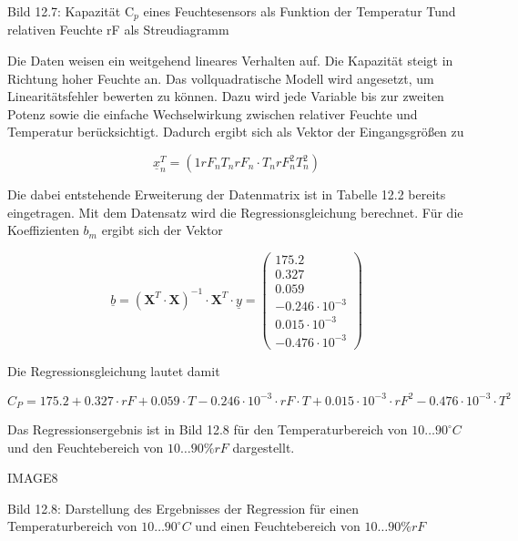 \noindent Bild 12.7: Kapazit\"{a}t C${}_{p}$ eines Feuchtesensors als Funktion der Temperatur Tund relativen Feuchte rF als Streudiagramm

\noindent Die Daten weisen ein weitgehend lineares Verhalten auf. Die Kapazit\"{a}t steigt in Richtung hoher Feuchte an. Das vollquadratische Modell wird angesetzt, um Linearit\"{a}tsfehler bewerten zu k\"{o}nnen. Dazu wird jede Variable bis zur zweiten Potenz sowie die einfache Wechselwirkung zwischen relativer Feuchte und Temperatur ber\"{u}cksichtigt. Dadurch ergibt sich als Vektor der Eingangsgr\"{o}{\ss}en zu

\begin{equation}\label{eq:thirteenthirty}
\underline{x}_{n}^{T} =\left(1 rF_{n} T_{n} rF_{n} \cdot T_{n} rF_{n}^{2} T_{n}^{2} \right)
\end{equation}

\noindent Die dabei entstehende Erweiterung der Datenmatrix ist in Tabelle 12.2 bereits eingetragen. Mit dem Datensatz wird die Regressionsgleichung berechnet. F\"{u}r die Koeffizienten $b_{m}$ ergibt sich der Vektor

\begin{equation}\label{eq:thirteenthirtyone}
\underline{b}=\left(\textbf{X}^{T} \cdot \textbf{X}\right)^{-1} \cdot \textbf{X}^{T} \cdot \underline{y}=\left(\begin{array}{c} {175.2} \\ {0.327} \\ {0.059} \\ {-0.246\cdot 10^{-3}} \\ {0.015\cdot 10^{-3}} \\ {-0.476\cdot 10^{-3}} \end{array}\right)
\end{equation}

\noindent Die Regressionsgleichung lautet damit

\begin{equation}\label{eq:thirteenthirtytwo}
C_{P} =175.2+0.327\cdot rF+ 0.059\cdot T-0.246\cdot 10^{-3} \cdot rF\cdot T+0.015\cdot 10^{-3} \cdot rF^{2} -0.476\cdot 10^{-3} \cdot T^{2}
\end{equation}

\noindent Das Regressionsergebnis ist in Bild 12.8 f\"{u}r den Temperaturbereich von $10 \dots90 ^{\circ} C$ und den Feuchtebereich von $10 \dots 90 \% rF$ dargestellt.

IMAGE8

\noindent Bild 12.8: Darstellung des Ergebnisses der Regression f\"{u}r einen Temperaturbereich von $10 \dots90 ^{\circ} C$ und einen Feuchtebereich von $10 \dots 90 \% rF$

